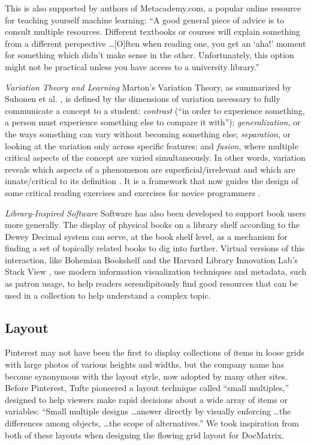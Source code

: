 This is also supported by authors of Metacademy.com, a popular online resource for teaching yourself machine learning: ``A good general piece of advice is to consult multiple resources. Different textbooks or courses will explain something from a different perspective \ldots [O]ften when reading one, you get an ‘aha!’ moment for something which didn't make sense in the other. Unfortunately, this option might not be practical unless you have access to a university library.'' \cite{metacademy}

\textit{Variation Theory and Learning}  \hspace{2 mm}
Marton's Variation Theory, as summarized by Suhonen et al. \cite{suhonen}, is defined by the dimensions of variation necessary to fully communicate a concept to a student: \emph{contrast} (``in order to experience something, a person must experience something else to compare it with''); \emph{generalization}, or the ways something can vary without becoming something else; \emph{separation}, or looking at the variation only across specific features; and \emph{fusion}, where multiple critical aspects of the concept are varied simultaneously. In other words, variation reveals which aspects of a phenomenon are superficial/irrelevant and which are innate/critical to its definition \cite{Leung}. It is a framework that now guides the design of some critical reading exercises \cite{Tong} and exercises for novice programmers \cite{eckerdal}. 

\textit{Library-Inspired Software}  \hspace{2 mm}
Software has also been developed to support book users more generally. The display of physical books on a library shelf according to the Dewey Decimal system can serve, at the book shelf level, as a mechanism for finding a set of topically related books to dig into further. Virtual versions of this interaction, like Bohemian Bookshelf \cite{bohemian} and the Harvard Library Innovation Lab's Stack View \cite{stackview}, use modern information visualization techniques and metadata, such as patron usage, to help readers serendipitously find good resources that can be used in a collection to help understand a complex topic.

\subsection{Layout}
Pinterest may not have been the first to display collections of items in loose grids with large photos of various heights and widths, but the company name has become synonymous with the layout style, now adopted by many other sites. Before Pinterest, Tufte pioneered a layout technique called ``small multiples,'' designed to help viewers make rapid decisions about a wide array of items or variables: ``Small multiple designs \ldots answer directly by visually enforcing \ldots the differences among objects, \ldots the scope of alternatives.'' We took inspiration from both of these layouts when designing the flowing grid layout for DocMatrix. 


